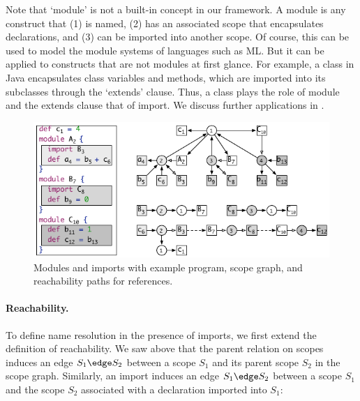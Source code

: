 Note that `module' is not a built-in concept in our framework.
A module is any construct that (1) is named, (2) has an associated scope that
encapsulates declarations, and (3) can be imported into another scope.
Of course, this can be used to model the module systems of languages such as ML. 
But it can be applied to constructs that are not modules at first glance.
For example, a class in Java encapsulates class variables and methods, which are
imported into its subclasses through the `extends' clause. 
Thus, a class plays the role of module and the extends clause that of import.
We discuss further applications in .


\begin{figure}[t]
\begin{boxedminipage}{\hsize}
\centering\includegraphics{figures/scope-graphs/imports/imports.pdf}
\end{boxedminipage}
\vspace*{-\baselineskip}
\caption{Modules and imports with example program, scope graph, and reachability
paths for references.}
\end{figure}


\paragraph{Reachability.}

To define name resolution in the presence of imports, we first extend the
definition of reachability.
We saw above that the parent relation on scopes induces an edge $S_1 \edge
S_2$ between a scope $S_1$ and its parent scope $S_2$ in the scope graph.
Similarly, an import induces an edge $S_1 \edge S_2$ between a scope $S_1$ and
the scope $S_2$ associated with a declaration imported into $S_1$:

\vspace*{-0.5\baselineskip}

